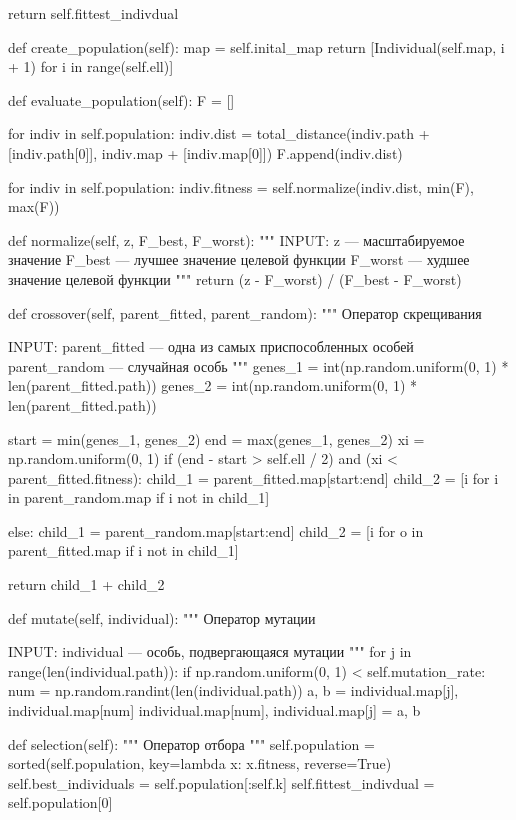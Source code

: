 \begin{pyprint}
    return self.fittest_indivdual

  def create_population(self):
    map = self.inital_map
    return [Individual(self.map, i + 1) for i in range(self.ell)]

  def evaluate_population(self):
    F = []

    for indiv in self.population:
       indiv.dist = total_distance(indiv.path + [indiv.path[0]],
                                   indiv.map + [indiv.map[0]])
       F.append(indiv.dist)

    for indiv in self.population:
       indiv.fitness = self.normalize(indiv.dist,
                                      min(F), max(F))

  def normalize(self, z, F_best, F_worst):
    """
    INPUT:
    z --- масштабируемое значение
    F_best --- лучшее значение целевой функции
    F_worst --- худшее значение целевой функции
    """
    return (z - F_worst) / (F_best - F_worst)

  def crossover(self, parent_fitted, parent_random):
    """
    Оператор скрещивания

    INPUT:
    parent_fitted --- одна из самых приспособленных особей
    parent_random --- случайная особь
    """
    genes_1 = int(np.random.uniform(0, 1) * len(parent_fitted.path))
    genes_2 = int(np.random.uniform(0, 1) * len(parent_fitted.path))

    start = min(genes_1, genes_2)
    end = max(genes_1, genes_2)
    xi = np.random.uniform(0, 1)
    if (end - start > self.ell / 2) and (xi < parent_fitted.fitness):
       child_1 = parent_fitted.map[start:end]
       child_2 = [i for i in parent_random.map if i not in child_1]
\end{pyprint}

\begin{pyprint}
    else:
       child_1 = parent_random.map[start:end]
       child_2 = [i for o in parent_fitted.map if i not in child_1]

    return child_1 + child_2

  def mutate(self, individual):
    """
    Оператор мутации

    INPUT:
    individual --- особь, подвергающаяся мутации
    """
    for j in range(len(individual.path)):
       if np.random.uniform(0, 1) < self.mutation_rate:
          num = np.random.randint(len(individual.path))
          a, b = individual.map[j], individual.map[num]
          individual.map[num], individual.map[j] = a, b

  def selection(self):
    """
    Оператор отбора
    """
    self.population = sorted(self.population,
                             key=lambda x: x.fitness, reverse=True)
    self.best_individuals = self.population[:self.k]
    self.fittest_indivdual = self.population[0]
\end{pyprint}

